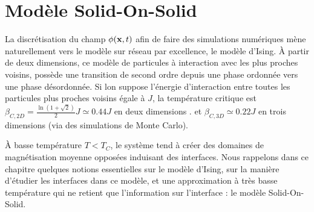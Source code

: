 \chapter{Modèle Solid-On-Solid}

La discrétisation du champ $\phi({\bf x},t)$ afin de faire des simulations numériques mène naturellement vers le modèle sur réseau par excellence, le modèle d'Ising. À partir de deux dimensions, ce modèle de particules à interaction avec les plus proches voisins, possède une transition de second ordre depuis une phase ordonnée vers une phase désordonnée. Si lon suppose l'énergie d'interaction entre toutes les particules plus proches voisins égale à $J$, la température critique est $\beta_{C,2D} =  \frac{\ln(1+\sqrt{2})}{2} J \simeq 0.44 J$ en deux dimensions \cite{onsager_crystal_1944}. et $\beta_{C,3D} \simeq 0.22 J$ en trois dimensions \cite{talapov_magnetization_1996} (via des simulations de Monte Carlo).

À basse température $T \less T_C$, le système tend à créer des domaines de magnétisation moyenne opposées induisant des interfaces. Nous rappelons dans ce chapitre quelques notions essentielles sur le modèle d'Ising, sur la manière d'étudier les interfaces dans ce modèle, et une approximation à très basse température qui ne retient que l'information sur l'interface : le modèle Solid-On-Solid.

